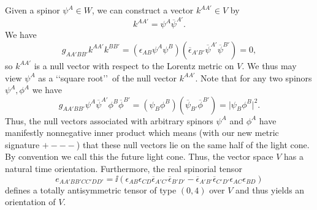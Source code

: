 Given a spinor \(\psi^A\in W\), we can construct a vector \(k^{AA'}\in V\) by
\begin{equation}
  k^{AA'}=\psi^A\overline\psi^{A'}.
  \tag{13.1.33}\label{eq:13.1.33}
\end{equation}
We have
\begin{equation}
  g_{AA'BB'}k^{AA'}k^{BB'}
  =(\epsilon_{AB}\psi^A\psi^B)
    (\overline\epsilon_{A'B'}\overline\psi^{A'}\overline\psi^{B'})=0,
  \tag{13.1.34}\label{eq:13.1.34}
\end{equation}
so \(k^{AA'}\) is a null vector with respect to the Lorentz metric on \(V\). We
thus may view \(\psi^A\) as a \lq\lq square root\rq\rq\ of the null vector
\(k^{AA'}\). Note that for any two spinors \(\psi^A,\phi^A\) we have
\begin{equation}
  g_{AA'BB'}\psi^A\overline\psi^{A'}\phi^B\overline\phi^{B'}
  =(\psi_B\phi^B)(\overline\psi_{B'}\overline\phi^{B'})
  =\lvert\psi_B\phi^B\rvert^2.
  \tag{13.1.35}\label{eq:13.1.35}
\end{equation}
Thus, the null vectors associated with arbitrary spinors \(\psi^A\) and \(\phi^A\)
have manifestly nonnegative inner product which means (with our new metric
signature \(+---\)) that these null vectors lie on the same half of the light cone. By
convention we call this the future light cone. Thus, the vector space \(V\) has a
natural time orientation. Furthermore, the real spinorial tensor
\begin{equation}
  e_{AA'BB'CC'DD'}=\ii\left(
    \epsilon_{AB}\epsilon_{CD}\overline\epsilon_{A'C'}\overline\epsilon_{B'D'}
    -\overline\epsilon_{A'B'}\overline\epsilon_{C'D'}\epsilon_{AC}\epsilon_{BD}
  \right)
  \tag{13.1.36}\label{eq:13.1.36}
\end{equation}
defines a totally antisymmetric tensor of type \((0,4)\) over \(V\) and thus yields
an orientation of \(V\).

